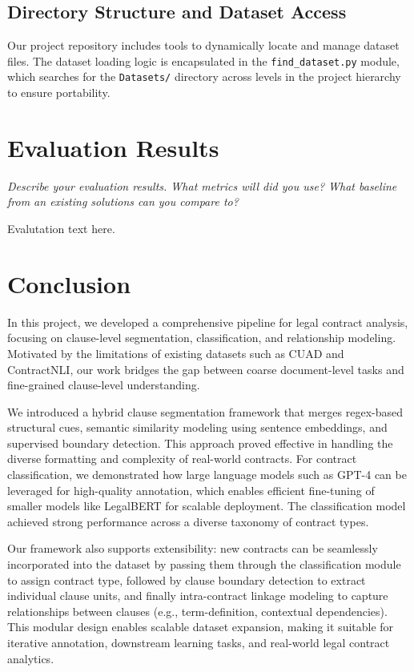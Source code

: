 \documentclass[11pt, oneside]{article}   	%
\begin{document}
\subsection*{Directory Structure and Dataset Access}

Our project repository includes tools to dynamically locate and manage dataset files. The dataset loading logic is encapsulated in the \texttt{find\_dataset.py} module, which searches for the \texttt{Datasets/} directory across levels in the project hierarchy to ensure portability.

\section*{Evaluation Results}

\textit{Describe your evaluation results. What metrics
will did you use? What baseline from an existing solutions can you compare to?}

Evalutation text here.


\section*{Conclusion}

In this project, we developed a comprehensive pipeline for legal contract analysis, focusing on clause-level segmentation, classification, and relationship modeling. Motivated by the limitations of existing datasets such as CUAD and ContractNLI, our work bridges the gap between coarse document-level tasks and fine-grained clause-level understanding.

We introduced a hybrid clause segmentation framework that merges regex-based structural cues, semantic similarity modeling using sentence embeddings, and supervised boundary detection. This approach proved effective in handling the diverse formatting and complexity of real-world contracts. For contract classification, we demonstrated how large language models such as GPT-4 can be leveraged for high-quality annotation, which enables efficient fine-tuning of smaller models like LegalBERT for scalable deployment. The classification model achieved strong performance across a diverse taxonomy of contract types.

Our framework also supports extensibility: new contracts can be seamlessly incorporated into the dataset by passing them through the classification module to assign contract type, followed by clause boundary detection to extract individual clause units, and finally intra-contract linkage modeling to capture relationships between clauses (e.g., term-definition, contextual dependencies). This modular design enables scalable dataset expansion, making it suitable for iterative annotation, downstream learning tasks, and real-world legal contract analytics.
\end{document}
